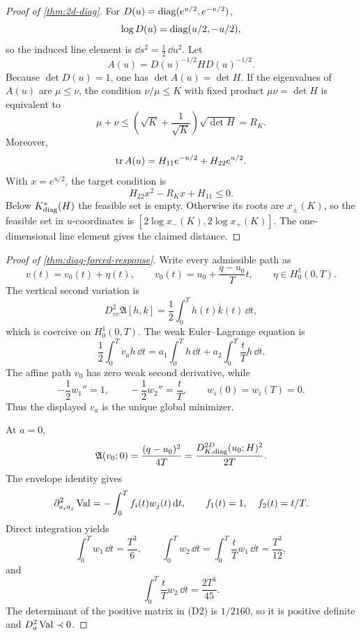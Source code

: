 \begin{proof}[Proof of \cref{thm:2d-diag}]
For \(D(u)=\operatorname{diag}(e^{u/2},e^{-u/2})\),
\[
  \log D(u)=\operatorname{diag}(u/2,-u/2),
\]
so the induced line element is \(\dd s^2=\frac12\,\dd u^2\).
Let
\[
  A(u)=D(u)^{-1/2}HD(u)^{-1/2}.
\]
Because \(\det D(u)=1\), one has \(\det A(u)=\det H\).  If the eigenvalues
of \(A(u)\) are \(\mu\le\nu\), the condition \(\nu/\mu\le K\) with
fixed product \(\mu\nu=\det H\) is equivalent to
\[
  \mu+\nu
  \le
  \left(\sqrt K+\frac1{\sqrt K}\right)\sqrt{\det H}
  =R_K.
\]
Moreover,
\[
  \operatorname{tr} A(u)=H_{11}e^{-u/2}+H_{22}e^{u/2}.
\]
With \(x=e^{u/2}\), the target condition is
\[
  H_{22}x^2-R_Kx+H_{11}\le0.
\]
Below \(K_{\operatorname{diag}}^\ast(H)\) the feasible set is empty.  Otherwise its roots
are \(x_\pm(K)\), so the feasible set in \(u\)-coordinates is
\([2\log x_-(K),2\log x_+(K)]\).  The one-dimensional line element gives
the claimed distance.
\end{proof}

\begin{proof}[Proof of \cref{thm:diag-forced-response}]
Write every admissible path as
\[
  v(t)=v_0(t)+\eta(t),
  \qquad
  v_0(t)=u_0+\frac{q-u_0}{T}t,
  \qquad
  \eta\in H_0^1(0,T).
\]
The vertical second variation is
\[
  D_{vv}^2\mathfrak A[h,k]
  =\frac12\int_0^T\dot h(t)\dot k(t)\,\dd t,
\]
which is coercive on \(H_0^1(0,T)\).  The weak Euler--Lagrange equation is
\[
  \frac12\int_0^T\dot v_a\dot h\,\dd t
  =
  a_1\int_0^T h\,\dd t
  +a_2\int_0^T\frac{t}{T}h\,\dd t.
\]
The affine path \(v_0\) has zero weak second derivative, while
\[
  -\frac12w_1''=1,
  \qquad
  -\frac12w_2''=\frac{t}{T},
  \qquad
  w_i(0)=w_i(T)=0.
\]
Thus the displayed \(v_a\) is the unique global minimizer.

At \(a=0\),
\[
  \mathfrak A(v_0;0)
  =\frac{(q-u_0)^2}{4T}
  =\frac{D_{K,\operatorname{diag}}^{2D}(u_0;H)^2}{2T}.
\]
The envelope identity gives
\[
  \partial_{a_i a_j}^2\operatorname{Val}
  =-\int_0^T f_i(t)w_j(t)\,\mathrm d t,
  \qquad
  f_1(t)=1,
  \quad f_2(t)=t/T.
\]
Direct integration yields
\[
  \int_0^T w_1\,\dd t=\frac{T^3}{6},
  \qquad
  \int_0^T w_2\,\dd t
  =\int_0^T\frac{t}{T}w_1\,\dd t=\frac{T^3}{12},
\]
and
\[
  \int_0^T\frac{t}{T}w_2\,\dd t=\frac{2T^3}{45}.
\]
The determinant of the positive matrix in \textup{(D2)} is \(1/2160\), so
it is positive definite and \(D_a^2\operatorname{Val}\prec0\).
\end{proof}

